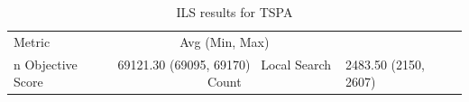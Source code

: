 \begin{table}[h!]
\centering
\begin{tabular}{lc}
\hline
Metric & Avg (Min, Max) \\n\hline
Objective Score & 69121.30 (69095, 69170) \
Local Search Count & 2483.50 (2150, 2607) \
\hline
\end{tabular}
\caption{ILS results for TSPA}
\label{tab:TSPA_ils_scores}
\end{table}
